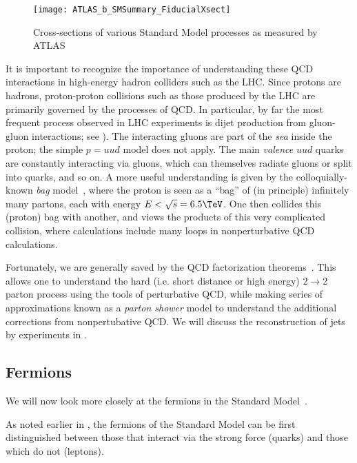 \begin{sidewaysfigure}[htbp]
\caption{Cross-sections of various Standard Model processes as measured by ATLAS}
\label{fig:sm_xsec}
\texttt{[image: ATLAS\_b\_SMSummary\_FiducialXsect]}
\end{sidewaysfigure}

It is important to recognize the importance of understanding these QCD interactions in high-energy hadron colliders such as the LHC.
Since protons are hadrons, proton-proton collisions such as those produced by the LHC are primarily governed by the processes of QCD.
In particular, by far the most frequent process observed in LHC experiments is dijet production from gluon-gluon interactions; see ).
The interacting gluons are part of the \textit{sea} inside the proton; the simple $p = uud$ model does not apply.
The main \textit{valence} $uud$ quarks are constantly interacting via gluons, which can themselves radiate gluons or split into quarks, and so on.
A more useful understanding is given by the colloquially-known \textit{bag} model~\cite{Chodos:1974je, Chodos:1974pn}, where the proton is seen as a ``bag'' of (in principle) infinitely many partons, each with energy $ E < \sqrt{s} = 6.5 \TeV$.
One then collides this (proton) bag with another, and views the products of this very complicated collision, where calculations include many loops in nonperturbative QCD calculations.

Fortunately, we are generally saved by the QCD factorization theorems~\cite{Collins:1989gx}.
This allows one to understand the hard (i.e. short distance or high energy) $2 \rightarrow 2$ parton process using the tools of perturbative QCD, while making series of approximations known as a \textit{parton shower} model to understand the additional corrections from nonpertubative QCD.
We will discuss the reconstruction of jets by experiments in .

\subsection{Fermions}

We will now look more closely at the fermions in the Standard Model~\cite{Agashe:2014kda}.

As noted earlier in , the fermions of the Standard Model can be first distinguished between those that interact via the strong force (quarks) and those which do not (leptons).

